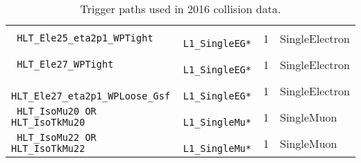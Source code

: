 \begin{table}[h]
\begin{tabular}{|l|l|c|l|}
\verb| HLT_Ele25_eta2p1_WPTight                        | & \verb| L1_SingleEG*         |  & 1 & SingleElectron \\
\verb| HLT_Ele27_WPTight                               | & \verb| L1_SingleEG*         |  & 1 & SingleElectron \\
\verb| HLT_Ele27_eta2p1_WPLoose_Gsf                    | & \verb| L1_SingleEG*         |  & 1 & SingleElectron \\
\verb| HLT_IsoMu20 OR HLT_IsoTkMu20                    | & \verb| L1_SingleMu*         |  & 1 & SingleMuon \\
\verb| HLT_IsoMu22 OR HLT_IsoTkMu22                    | & \verb| L1_SingleMu*         |  & 1 & SingleMuon \\
\hline %
    \end{tabular}
\small
    \caption{Trigger paths used in 2016 collision data.}
    \label{tab:triggerPaths2016}
\end{table}

	
	
